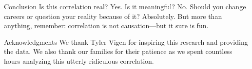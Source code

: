 \documentclass{article}
\begin{document}
\begin{section}{Conclusion}
 Is this correlation real? Yes. Is it meaningful? No. Should you change careers or question your reality because of it? Absolutely. But more than anything, remember: correlation is not causation—but it sure is fun.
\end{section}

\begin{section}{Acknowledgments}
 We thank Tyler Vigen for inspiring this research and providing the data. We also thank our families for their patience as we spent countless hours analyzing this utterly ridiculous correlation.
\end{section}


\end{document}
